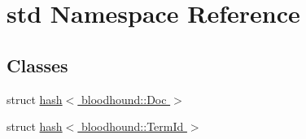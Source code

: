 \hypertarget{namespacestd}{}\section{std Namespace Reference}
\label{namespacestd}
\subsection*{Classes}
\begin{DoxyCompactItemize}
\item 
struct \hyperlink{structstd_1_1hash_3_01bloodhound_1_1Doc_01_4}{hash$<$ bloodhound\+::\+Doc $>$}
\item 
struct \hyperlink{structstd_1_1hash_3_01bloodhound_1_1TermId_01_4}{hash$<$ bloodhound\+::\+Term\+Id $>$}
\end{DoxyCompactItemize}
